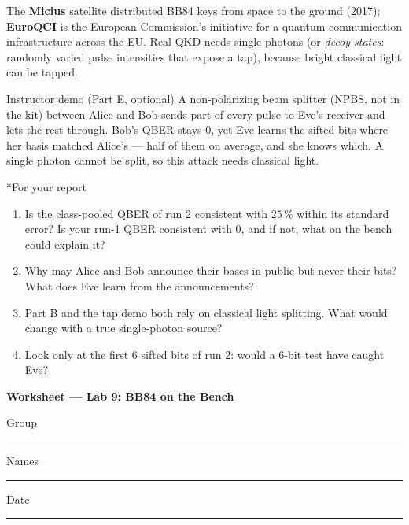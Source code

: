 \documentclass[a4paper,11pt]{article}
\makeatletter
\renewcommand\section{\@startsection{section}{1}{\z@}{-1.6ex \@plus -.5ex}{0.6ex}{\normalfont\large\bfseries\color{ibmblue}}}
\newenvironment{steps}{\begin{enumerate}\setlength{\itemsep}{1pt}\setlength{\parsep}{0pt}\setlength{\topsep}{2pt}}{\end{enumerate}}
\newcommand{\blank}[1]{\rule{#1}{0.4pt}}
\makeatother
\begin{document}
\begin{industrybox}
The \textbf{Micius} satellite distributed BB84 keys from space to the ground (2017);
\textbf{EuroQCI} is the European Commission's initiative for a quantum communication
infrastructure across the EU. Real QKD needs single photons (or \emph{decoy states}:
randomly varied pulse intensities that expose a tap), because bright classical light
can be tapped.
\end{industrybox}

\begin{demobox}{Instructor demo (Part E, optional)}
A non-polarizing beam splitter (NPBS, not in the kit) between Alice and Bob sends part
of every pulse to Eve's receiver and lets the rest through. Bob's QBER stays 0, yet Eve
learns the sifted bits where her basis matched Alice's --- half of them on average, and
she knows which. A single photon cannot be split, so this attack needs classical light.
\end{demobox}

\section*{For your report}
\begin{steps}
  \item Is the class-pooled QBER of run 2 consistent with $25\,\%$ within its standard
        error? Is your run-1 QBER consistent with 0, and if not, what on the bench could
        explain it?
  \item Why may Alice and Bob announce their bases in public but never their bits? What
        does Eve learn from the announcements?
  \item Part B and the tap demo both rely on classical light splitting. What would change
        with a true single-photon source?
  \item Look only at the first 6 sifted bits of run 2: would a 6-bit test have caught Eve?
\end{steps}

\newpage
\setlength{\tabcolsep}{2pt}
{\large\bfseries\color{ibmblue} Worksheet --- Lab 9: BB84 on the Bench}\par
{\small Group \blank{1.5cm}\quad Names \blank{8.5cm}\quad Date \blank{2.5cm}}
\end{document}

